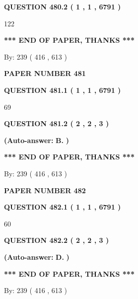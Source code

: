 \documentclass{ctexart}
\begin{document}
  
{\textbf{\large{QUESTION
480.2 
 ( 1 , 1 , 6791 )
}}}

122
   
   
   
   
\vspace{1.0in} 
{\textbf{\large{ *** END OF PAPER, THANKS *** }}} 
   
   
\hspace{1.0in} By: 
 239 ( 416 ,  613 )
   
   
   
   
\newpage 
\setcounter{page}{ 
   481001 } 
   
   
 {\textbf{ \Large{ PAPER NUMBER  481  }}}
   
   
   
   
  
  
{\textbf{\large{QUESTION
481.1 
 ( 1 , 1 , 6791 )
}}}

69
  
  
{\textbf{\large{QUESTION
481.2 
 ( 2 , 2 , 3 )
}}}
 
 
{\textbf{(Auto-answer:}}
{\textbf{\large{
B.}}}
{\textbf{)}}
 
 
   
   
   
   
\vspace{1.0in} 
{\textbf{\large{ *** END OF PAPER, THANKS *** }}} 
   
   
\hspace{1.0in} By: 
 239 ( 416 ,  613 )
   
   
   
   
\newpage 
\setcounter{page}{ 
   482001 } 
   
   
 {\textbf{ \Large{ PAPER NUMBER  482  }}}
   
   
   
   
  
  
{\textbf{\large{QUESTION
482.1 
 ( 1 , 1 , 6791 )
}}}

60
  
  
{\textbf{\large{QUESTION
482.2 
 ( 2 , 2 , 3 )
}}}
 
 
{\textbf{(Auto-answer:}}
{\textbf{\large{
D.}}}
{\textbf{)}}
 
 
   
   
   
   
\vspace{1.0in} 
{\textbf{\large{ *** END OF PAPER, THANKS *** }}} 
   
   
\hspace{1.0in} By: 
 239 ( 416 ,  613 )
   
   
   
\end{document}
